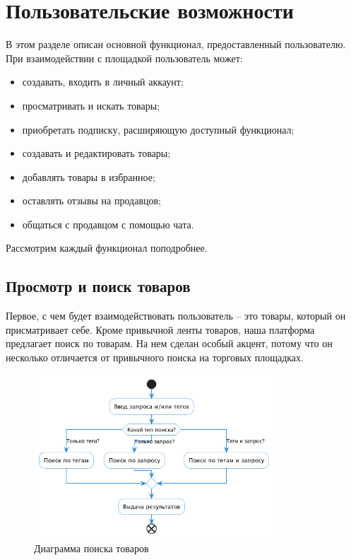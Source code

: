 \documentclass[a4paper,14pt]{extarticle}
\begin{document}


\section{Пользовательские возможности}

В этом разделе описан основной функционал, предоставленный пользователю. При взаимодействии с площадкой пользователь может:
\begin{itemize}
    \item создавать, входить в личный аккаунт;
    \item просматривать и искать товары;
    \item приобретать подписку, расширяющую доступный функционал;
    \item создавать и редактировать товары;
    \item добавлять товары в избранное;
    \item оставлять отзывы на продавцов;
    \item общаться с продавцом с помощью чата.
\end{itemize}
Рассмотрим каждый функционал поподробнее.

\subsection{Просмотр и поиск товаров}

Первое, с чем будет взаимодействовать пользователь -- это товары, который он присматривает себе. Кроме привычной ленты товаров, наша платформа предлагает поиск по товарам. На нем сделан особый акцент, потому что он несколько отличается от привычного поиска на торговых площадках.

\begin{figure}[H]
    \centering
    \includegraphics[width=0.8\textwidth]{images/search.png}
    \caption{Диаграмма поиска товаров}
\end{figure}
\end{document}
